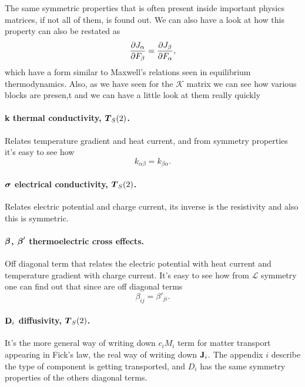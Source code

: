 \noindent
The same symmetric properties that is often present inside important physics matrices, if not all of them, is found out. We can also have a look at how this property can also be restated as
\begin{equation}
    \pdv{J_\alpha}{F_\beta} = \pdv{J_\beta}{F_\alpha},
\end{equation} 
which have a form similar to Maxwell's relations seen in equilibrium thermodynamics. Also, as we have seen for the $\mathcal{K}$ matrix we can see how various blocks are presen,t and we can have a little look at them really quickly

\paragraph{\bf k thermal conductivity, $\vb*{T}_S(2)$.} Relates temperature gradient and heat current, and from symmetry properties it's easy to see how
\begin{equation}
    k_{\alpha\beta} = k_{\beta\alpha}.
\end{equation}

\paragraph{$\vb*{\sigma}$ \bf electrical conductivity, $\vb*{T}_S(2)$.} Relates electric potential and charge current, its inverse is the resistivity and also this is symmetric.

\paragraph{$\vb*{\beta}$, $\vb*{\beta}'$ \bf thermoelectric cross effects.} Off diagonal term that relates the electric potential with heat current and temperature gradient with charge current. It's easy to see how from $\mathcal{L}$ symmetry one can find out that since are off diagonal terms
\begin{equation}
    \label{eq:ThermoeTensorProp}
    \beta_{ij} = \beta'_{ji}.
\end{equation}

\paragraph{\bf $\vb{D}_i$ diffusivity, $\vb*{T}_S(2)$.} It's the more general way of writing down $c_i M_i$ term for matter transport appearing in Fick's law, the real way of writing down $\vb{J}_i$. The appendix $i$ describe the type of component is getting transported, and $D_i$ has the same symmetry properties of the others diagonal terms.

